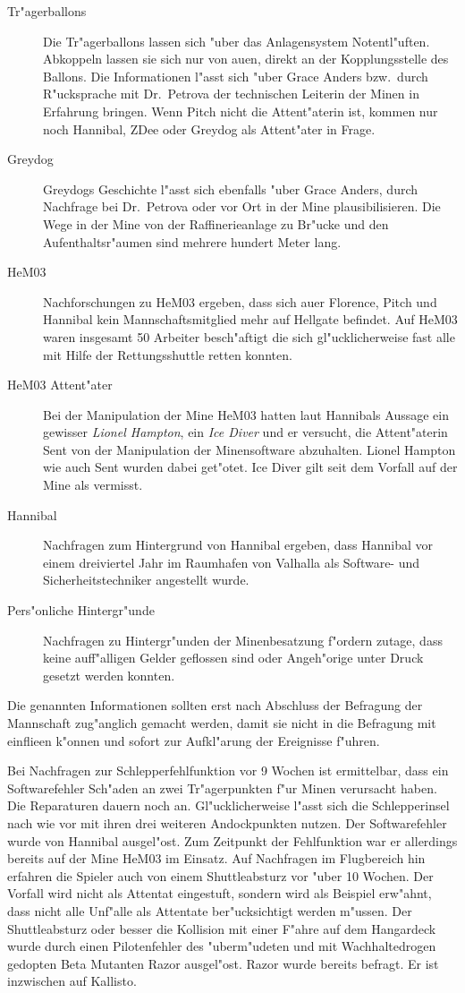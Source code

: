 \begin{description}
	\item[Tr"agerballons] Die Tr"agerballons lassen sich "uber das Anlagensystem Notentl"uften. Abkoppeln lassen sie sich nur von au\3en, 
		direkt an der Kopplungsstelle des Ballons. Die Informationen l"asst sich "uber Grace Anders bzw.~durch R"ucksprache mit Dr.~Petrova der technischen Leiterin der Minen in Erfahrung bringen. Wenn Pitch nicht die Attent"aterin ist, kommen nur noch Hannibal, ZDee oder Greydog als Attent"ater in Frage.
	\item[Greydog] Greydogs Geschichte l"asst sich ebenfalls "uber Grace Anders, durch Nachfrage bei Dr.~Petrova oder vor Ort in der Mine 
		plausibilisieren. Die Wege in der Mine von der Raffinerieanlage zu Br"ucke und den Aufenthaltsr"aumen sind mehrere hundert Meter lang.
	\item[HeM03] Nachforschungen zu HeM03 ergeben, dass sich au\3er Florence, Pitch und Hannibal kein Mannschaftsmitglied mehr auf Hellgate befindet. Auf HeM03 waren insgesamt 50 Arbeiter besch"aftigt die sich gl"ucklicherweise fast alle mit Hilfe der Rettungsshuttle retten konnten. 
	\item[HeM03 Attent"ater] Bei der Manipulation der Mine HeM03 hatten laut Hannibals Aussage ein gewisser \emph{Lionel Hampton}, ein 
		\emph{Ice Diver} und er versucht, die Attent"aterin Sent von der Manipulation der Minensoftware abzuhalten. Lionel Hampton wie auch Sent wurden dabei get"otet. Ice Diver gilt seit dem Vorfall auf der Mine als vermisst.
	\item[Hannibal] Nachfragen zum Hintergrund von Hannibal ergeben, dass Hannibal vor einem dreiviertel Jahr im Raumhafen von Valhalla als 
		Software- und Sicherheitstechniker angestellt wurde.
	\item[Pers"onliche Hintergr"unde] Nachfragen zu Hintergr"unden der Minenbesatzung f"ordern zutage, dass keine auff"alligen Gelder 
		geflossen sind oder Angeh"orige unter Druck gesetzt werden konnten.
\end{description}

Die genannten Informationen sollten erst nach Abschluss der Befragung der Mannschaft zug"anglich gemacht werden, damit sie nicht in die Befragung mit einflie\3en k"onnen und sofort zur Aufkl"arung der Ereignisse f"uhren.

Bei Nachfragen zur Schlepperfehlfunktion vor 9 Wochen ist ermittelbar, dass ein Softwarefehler Sch"aden an zwei Tr"agerpunkten f"ur Minen verursacht haben. Die Reparaturen dauern noch an. Gl"ucklicherweise l"asst sich die Schlepperinsel nach wie vor mit ihren drei weiteren Andockpunkten nutzen. Der Softwarefehler wurde von Hannibal ausgel"ost. Zum Zeitpunkt der Fehlfunktion war er allerdings bereits auf der Mine HeM03 im Einsatz. Auf Nachfragen im Flugbereich hin erfahren die Spieler auch von einem Shuttleabsturz vor "uber 10 Wochen. Der Vorfall wird nicht als Attentat eingestuft, sondern wird als Beispiel erw"ahnt, dass nicht alle Unf"alle als Attentate ber"ucksichtigt werden m"ussen. Der Shuttleabsturz oder besser die Kollision mit einer F"ahre auf dem Hangardeck wurde durch einen Pilotenfehler des "uberm"udeten und mit Wachhaltedrogen gedopten Beta Mutanten Razor ausgel"ost. Razor wurde bereits befragt. Er ist inzwischen auf Kallisto.

